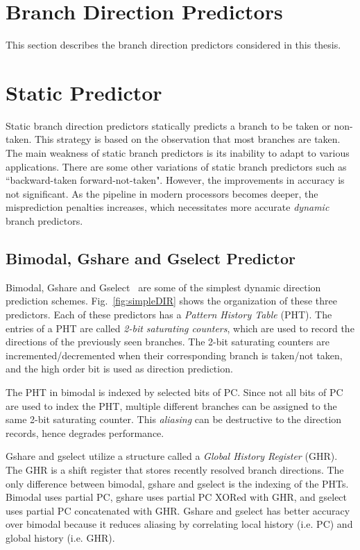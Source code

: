\section{Branch Direction Predictors}
\label{sec:background:dirpred}
This section describes the branch direction predictors considered in this thesis.

\section{Static Predictor}
\label{sec:background:dirpred:static}
Static branch direction predictors statically predicts a branch to be taken or non-taken. This strategy is based on the observation that most branches are taken. The main weakness of static branch predictors is its inability to adapt to various applications. There are some other variations of static branch predictors such as ``backward-taken forward-not-taken". However, the improvements in accuracy is not significant. As the pipeline in modern processors becomes deeper, the misprediction penalties increases, which necessitates more accurate \textit{dynamic} branch predictors.

\subsection{Bimodal, Gshare and Gselect Predictor}
\label{sec:background:dirpred:bimodal}
Bimodal, Gshare and Gselect~\cite{McFarling} are some of the simplest dynamic direction prediction schemes. Fig.~\ref{fig:simpleDIR} shows the organization of these three predictors. Each of these predictors has a \textit{Pattern History Table} (PHT). The entries of a PHT are called \textit{2-bit saturating counters}, which are used to record the directions of the previously seen branches. The 2-bit saturating counters are incremented/decremented when their corresponding branch is taken/not taken, and the high order bit is used as direction prediction.

The PHT in bimodal is indexed by selected bits of PC. Since not all bits of PC are used to index the PHT, multiple different branches can be assigned to the same 2-bit saturating counter. This \textit{aliasing} can be destructive to the direction records, hence degrades performance.

Gshare and gselect utilize a structure called a \textit{Global History Register} (GHR). The GHR is a shift register that stores recently resolved branch directions. The only difference between bimodal, gshare and gselect is the indexing of the PHTs. Bimodal uses partial PC, gshare uses partial PC XORed with GHR, and gselect uses partial PC concatenated with GHR. Gshare and gselect has better accuracy over bimodal because it reduces aliasing by correlating local history (i.e. PC) and global history (i.e. GHR).


